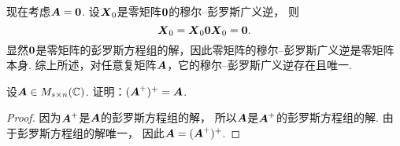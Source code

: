 \begin{remark}
现在考虑\(\boldsymbol{A} = \boldsymbol0\).
设\(\boldsymbol{X}_0\)是零矩阵\(\boldsymbol0\)的穆尔--彭罗斯广义逆，
则\begin{equation*}
	\boldsymbol{X}_0 = \boldsymbol{X}_0 \boldsymbol0 \boldsymbol{X}_0 = \boldsymbol0.
\end{equation*}
显然\(\boldsymbol0\)是零矩阵的彭罗斯方程组的解，因此零矩阵的穆尔--彭罗斯广义逆是零矩阵本身.
综上所述，对任意复矩阵\(\boldsymbol{A}\)，它的穆尔--彭罗斯广义逆存在且唯一.
\end{remark}

\begin{example}
设\(\boldsymbol{A} \in M_{s \times n}(\mathbb{C})\).
证明：\((\boldsymbol{A}^+)^+ = \boldsymbol{A}\).
\begin{proof}
因为\(\boldsymbol{A}^+\)是\(\boldsymbol{A}\)的彭罗斯方程组的解，
所以\(\boldsymbol{A}\)是\(\boldsymbol{A}^+\)的彭罗斯方程组的解.
由于彭罗斯方程组的解唯一，
因此\(\boldsymbol{A} = (\boldsymbol{A}^+)^+\).
\end{proof}
\end{example}
